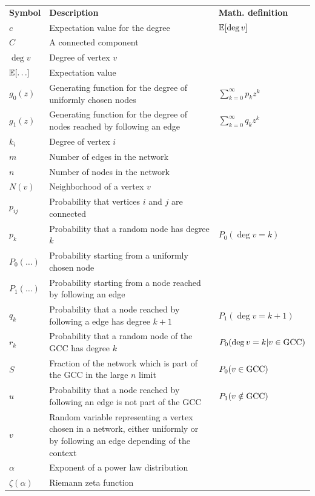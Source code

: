 \documentclass[
11pt, %
english, %
singlespacing, %
nolistspacing, %
liststotoc, %
headsepline, %
]{MastersDoctoralThesis} %
\begin{document}
\begin{longtable}{m{}m{}m{}}

\textbf{Symbol}	& \textbf{Description} & \textbf{Math. definition} \\
\addlinespace

$c$			& Expectation value for the degree & $\mathbb{E}\!\left[ \deg{v} \right]$ \\
$C$			& A connected component \\
$\deg{v}$	& Degree of vertex $v$ \\
$\expected{\dots}$	& Expectation value \\
$g_0(z)$	& Generating function for the degree of uniformly chosen nodes & $\sum_{k=0}^\infty p_k z^k$ \\
$g_1(z)$	& Generating function for the degree of nodes reached by following an edge & $\sum_{k=0}^\infty q_k z^k$ \\
$k_i$	& Degree of vertex $i$ \\
$m$		& Number of edges in the network \\
$n$			& Number of nodes in the network \\
$N(v)$ 		& Neighborhood of a vertex $v$ \\
$p_{ij}$	& Probability that vertices $i$ and $j$ are connected \\
$p_k$		& Probability that a random node has degree $k$ & $P_0(\deg{v} = k)$ \\
$P_0(\dots)$	& Probability starting from a uniformly chosen node \\
$P_1(\dots)$	& Probability starting from a node reached by following an edge \\
$q_k$		& Probability that a node reached by following a edge has degree $k + 1$ & $P_1(\deg{v} = k + 1)$ \\
$r_k$		& Probability that a random node of the GCC has degree $k$ & $P_0(\deg{v} = k | v \in \mathrm{GCC})$ \\
$S$ 		& Fraction of the network which is part of the GCC in the large $n$ limit & $P_0(v \in \mathrm{GCC})$ \\
$u$			& Probability that a node reached by following an edge is not part of the GCC & $P_1(v \notin \mathrm{GCC})$ \\
$v$			& Random variable representing a vertex chosen in a network, either uniformly or by following an edge depending of the context \\

\addlinespace
\addlinespace
\addlinespace

$\alpha$	& Exponent of a power law distribution \\
$\zeta(\alpha)$	& Riemann zeta function \\

\end{longtable}
\end{document}
